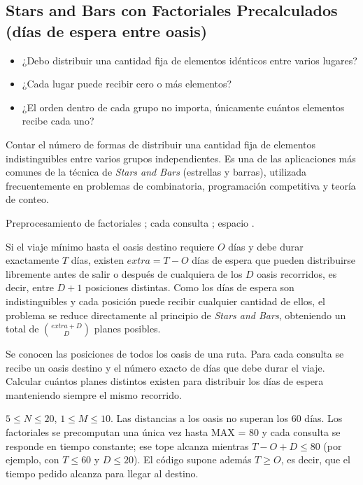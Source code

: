 \subsection{Stars and Bars con Factoriales Precalculados (días de espera entre oasis)}
\label{alg:8-5}


\begin{itemize}
\item ¿Debo distribuir una cantidad fija de elementos idénticos entre varios lugares?
\item ¿Cada lugar puede recibir cero o más elementos?
\item ¿El orden dentro de cada grupo no importa, únicamente cuántos elementos recibe cada uno?
\end{itemize}

 Contar el número de formas de distribuir una cantidad fija de elementos indistinguibles entre varios grupos independientes. Es una de las aplicaciones más comunes de la técnica de \textit{Stars and Bars} (estrellas y barras), utilizada frecuentemente en problemas de combinatoria, programación competitiva y teoría de conteo.

 Preprocesamiento de factoriales ; cada consulta ; espacio .

 Si el viaje mínimo hasta el oasis destino requiere $O$ días y debe durar exactamente $T$ días, existen $extra=T-O$ días de espera que pueden distribuirse libremente antes de salir o después de cualquiera de los $D$ oasis recorridos, es decir, entre $D+1$ posiciones distintas. Como los días de espera son indistinguibles y cada posición puede recibir cualquier cantidad de ellos, el problema se reduce directamente al principio de \textit{Stars and Bars}, obteniendo un total de $\binom{extra+D}{D}$ planes posibles.


Se conocen las posiciones de todos los oasis de una ruta. Para cada consulta se recibe un oasis destino y el número exacto de días que debe durar el viaje. Calcular cuántos planes distintos existen para distribuir los días de espera manteniendo siempre el mismo recorrido.

 $5 \le N \le 20$, $1 \le M \le 10$. Las distancias a los oasis no superan los 60 días. Los factoriales se precomputan una única vez hasta MAX = 80 y cada consulta se responde en tiempo constante; ese tope alcanza mientras $T - O + D \le 80$ (por ejemplo, con $T \le 60$ y $D \le 20$). El código supone además $T \ge O$, es decir, que el tiempo pedido alcanza para llegar al destino.

